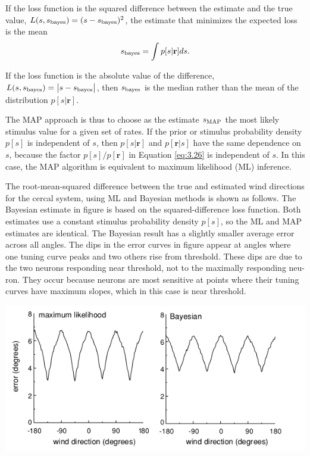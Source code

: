 \begin{exm}
  If the loss function is the squared difference between the estimate
  and the true value, $ L(s,s_{\rm{bayes}})=(s-s_{\rm{bayes}})^{2}$, the
  estimate that minimizes the expected loss is the mean
  \begin{equation}
    \label{eq:3.27}
    s_{\rm{bayes}}=\int p[s|\mathbf{r}]ds.
  \end{equation}
\end{exm}

\begin{exm}
 If the loss function is the absolute value of the
 difference, $L(s,s_{\rm{bayes}})=\big|s-s_{\rm{bayes}} \big|$, then
 $s_{\rm{bayes}}$ is the median rather than the mean of the
 distribution $p[s|\mathbf{r}]$.
\end{exm}


\begin{rem}
  The MAP approach is thus to choose as the estimate $s_{\rm{MAP}}$ the most
  likely stimulus value for a given set of rates. If the prior or
  stimulus probability density $p[s]$ is independent of $s$, then
  $p[s|\mathbf{r}]$ and $p[\mathbf{r}|s]$ have the same dependence on
  $s$, because the factor $p[s]/p[\mathbf{r}]$ in Equation \ref{eq:3.26} is independent of $s$. In this case, the MAP algorithm is equivalent to  maximum likelihood (ML) inference.
\end{rem}

\begin{exm}
  The root-mean-squared difference between
the true and estimated wind directions for the cercal system, using ML
and Bayesian methods is shown as follows. The Bayesian estimate in figure is based on the squared-difference loss function. Both
estimates use a constant stimulus probability density $p[s]$, so the ML and
MAP estimates are identical. The Bayesian result has a slightly
smaller average error across all angles. The dips in the error curves in figure
appear at angles where one tuning curve peaks and two others rise from
threshold. These dips are due to the two
neurons responding near threshold, not to the maximally responding neu-
ron. They occur because neurons are most sensitive at points where their
tuning curves have maximum slopes, which in this case is near threshold.
\begin{center}
  \includegraphics[scale = 0.4]{./png/3-7}
\end{center}
\end{exm}



